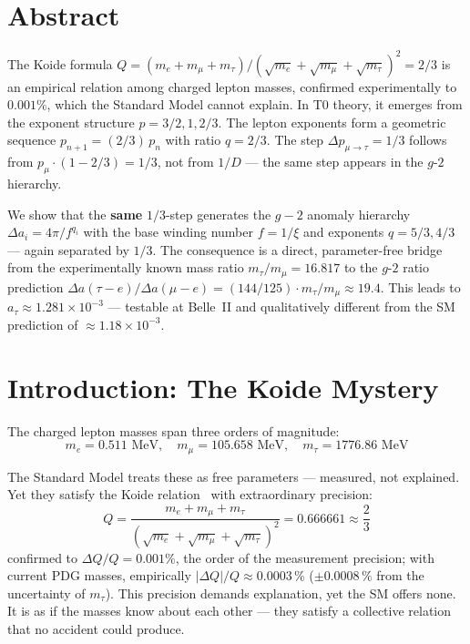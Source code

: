 \section*{Abstract}
	The Koide formula $Q = (m_e + m_\mu + m_\tau)/(\sqrt{m_e} + \sqrt{m_\mu} + \sqrt{m_\tau})^2 = 2/3$ is an empirical relation among charged lepton masses, confirmed experimentally to $0.001\%$, which the Standard Model cannot explain. In T0 theory, it emerges from the exponent structure $p = 3/2, 1, 2/3$. The lepton exponents form a geometric sequence $p_{n+1} = (2/3)\,p_n$ with ratio $q = 2/3$. The step $\Delta p_{\mu\to\tau} = 1/3$ follows from $p_\mu \cdot (1 - 2/3) = 1/3$, not from $1/D$ --- the same step appears in the $g$-$2$ hierarchy.
	
	We show that the \textbf{same} $1/3$-step generates the $g-2$ anomaly hierarchy $\Delta a_i = 4\pi/f^{q_i}$ with the base winding number $f = 1/\xi$ and exponents $q = 5/3, 4/3$ --- again separated by $1/3$. The consequence is a direct, parameter-free bridge from the experimentally known mass ratio $m_\tau/m_\mu = 16.817$ to the $g$-$2$ ratio prediction $\Delta a(\tau{-}e)/\Delta a(\mu{-}e) = (144/125) \cdot m_\tau/m_\mu \approx 19.4$. This leads to $a_\tau \approx 1.281 \times 10^{-3}$ --- testable at Belle~II and qualitatively different from the SM prediction of $\approx 1.18 \times 10^{-3}$.

\section{Introduction: The Koide Mystery}

The charged lepton masses span three orders of magnitude:
\begin{equation}
	m_e = 0.511 \text{ MeV}, \quad m_\mu = 105.658 \text{ MeV}, \quad m_\tau = 1776.86 \text{ MeV}
\end{equation}

The Standard Model treats these as free parameters --- measured, not explained. Yet they satisfy the Koide relation~\cite{Koide1983} with extraordinary precision:
\begin{equation}
	\boxed{Q = \frac{m_e + m_\mu + m_\tau}{\left(\sqrt{m_e} + \sqrt{m_\mu} + \sqrt{m_\tau}\right)^2} = 0.666661 \approx \frac{2}{3}}
	\label{eq:koide}
\end{equation}
confirmed to $\Delta Q/Q = 0.001\%$, the order of the measurement precision; with current PDG masses, empirically $|\Delta Q|/Q \approx 0.0003\,\%$ ($\pm0.0008\,\%$ from the uncertainty of $m_\tau$). This precision demands explanation, yet the SM offers none. It is as if the masses know about each other --- they satisfy a collective relation that no accident could produce.

